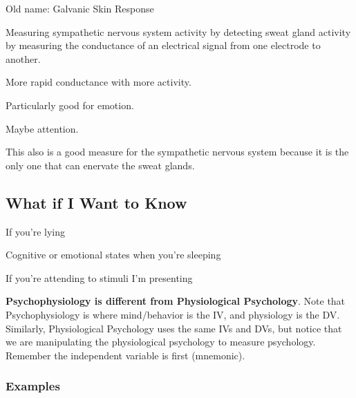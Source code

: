 \begin{coloredlist}
    \item {}
    \begin{coloredlist}
        \item Old name: Galvanic Skin Response
        \item Measuring sympathetic nervous system activity by detecting sweat gland activity by measuring the conductance of an electrical signal from one electrode to another.
        \item More rapid conductance with more activity.
        \item Particularly good for emotion.
        \item Maybe attention.
        \item This also is a good measure for the sympathetic nervous system because it is the only one that can enervate the sweat glands.
    \end{coloredlist}
\end{coloredlist}

\subsection*{What if I Want to Know}

\begin{coloredlist}
    \item If you're lying
    \item Cognitive or emotional states when you're sleeping
    \item If you're attending to stimuli I'm presenting
\end{coloredlist}

\textbf{Psychophysiology is different from Physiological Psychology}. Note that Psychophysiology is where mind/behavior is the IV, and physiology is the DV. Similarly, Physiological Psychology uses the same IVs and DVs, but notice that we are manipulating the physiological psychology to measure psychology. Remember the independent variable is first (mnemonic). \\

\subsubsection*{Examples}

